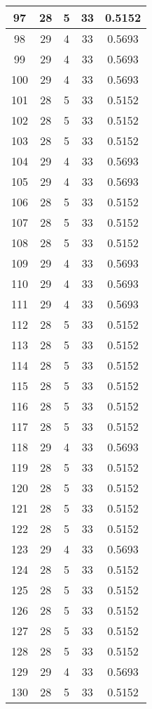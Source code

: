 \documentclass[letterpaper, 12pt]{article}
\begin{document}
\begin{longtable}{|c|c|c|c|c|}
\hline
97 & 28 & 5 & 33 & 0.5152 \\
\hline
98 & 29 & 4 & 33 & 0.5693 \\
\hline
99 & 29 & 4 & 33 & 0.5693 \\
\hline
100 & 29 & 4 & 33 & 0.5693 \\
\hline
101 & 28 & 5 & 33 & 0.5152 \\
\hline
102 & 28 & 5 & 33 & 0.5152 \\
\hline
103 & 28 & 5 & 33 & 0.5152 \\
\hline
104 & 29 & 4 & 33 & 0.5693 \\
\hline
105 & 29 & 4 & 33 & 0.5693 \\
\hline
106 & 28 & 5 & 33 & 0.5152 \\
\hline
107 & 28 & 5 & 33 & 0.5152 \\
\hline
108 & 28 & 5 & 33 & 0.5152 \\
\hline
109 & 29 & 4 & 33 & 0.5693 \\
\hline
110 & 29 & 4 & 33 & 0.5693 \\
\hline
111 & 29 & 4 & 33 & 0.5693 \\
\hline
112 & 28 & 5 & 33 & 0.5152 \\
\hline
113 & 28 & 5 & 33 & 0.5152 \\
\hline
114 & 28 & 5 & 33 & 0.5152 \\
\hline
115 & 28 & 5 & 33 & 0.5152 \\
\hline
116 & 28 & 5 & 33 & 0.5152 \\
\hline
117 & 28 & 5 & 33 & 0.5152 \\
\hline
118 & 29 & 4 & 33 & 0.5693 \\
\hline
119 & 28 & 5 & 33 & 0.5152 \\
\hline
120 & 28 & 5 & 33 & 0.5152 \\
\hline
121 & 28 & 5 & 33 & 0.5152 \\
\hline
122 & 28 & 5 & 33 & 0.5152 \\
\hline
123 & 29 & 4 & 33 & 0.5693 \\
\hline
124 & 28 & 5 & 33 & 0.5152 \\
\hline
125 & 28 & 5 & 33 & 0.5152 \\
\hline
126 & 28 & 5 & 33 & 0.5152 \\
\hline
127 & 28 & 5 & 33 & 0.5152 \\
\hline
128 & 28 & 5 & 33 & 0.5152 \\
\hline
129 & 29 & 4 & 33 & 0.5693 \\
\hline
130 & 28 & 5 & 33 & 0.5152 \\

\end{longtable}
\end{document}
